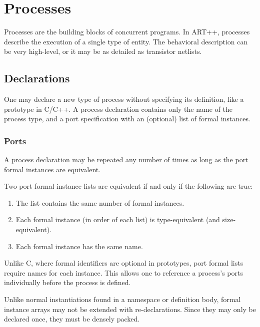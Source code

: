 
\chapter{Processes}
\label{sec:processes}

Processes are the building blocks of concurrent programs.  
In ART++, processes describe the execution of a single type of entity.  
The behavioral description can be very high-level, 
or it may be as detailed as transistor netlists.  

\section{Declarations}
\label{sec:process:declarations}

One may declare a new type of process without specifying its definition, 
like a prototype in C/C++.  
A process declaration contains only the name of the process type, 
and a port specification with an (optional) list of formal instances.  

\subsection{Ports}
\label{sec:processes:declarations:ports}


A process declaration may be repeated any number of times as long
as the port formal instances are equivalent.  

Two port formal instance lists are equivalent
if and only if the following are true:
\begin{enumerate}
\item The list contains the same number of formal instances.  
\item Each formal instance (in order of each list) is type-equivalent
	(and size-equivalent).
\item Each formal instance has the same name.  
\end{enumerate}

Unlike C, where formal identifiers are optional in prototypes, 
port formal lists require names for each instance.  
This allows one to reference a process's ports individually 
before the process is defined.  

Unlike normal instantiations found in a namespace or definition body, 
formal instance arrays may not be extended with re-declarations.  
Since they may only be declared once, they must be densely packed.  

